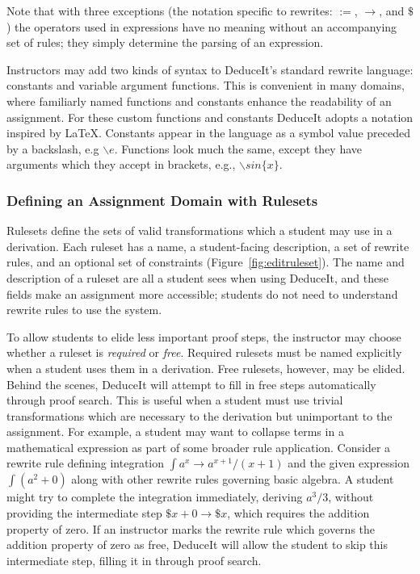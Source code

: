 \documentclass{sigchi}
\newcommand{\msb}[1]{\textbf{\textcolor{cyan}{Michael: #1}}}
\begin{document}
Note that with three exceptions (the notation specific to rewrites: $:=$, $\rightarrow$, and $\$$) the operators used in expressions have no meaning without an accompanying set of rules; they simply determine the parsing of an expression.

Instructors may add two kinds of syntax to DeduceIt's standard rewrite language: constants and variable argument functions. This is convenient in many domains, where familiarly named functions and constants enhance the readability of an assignment. For these custom functions and constants DeduceIt adopts a notation inspired by LaTeX. Constants appear in the language as a symbol value preceded by a backslash, e.g $\backslash{}e$. Functions look much the same, except they have arguments which they accept in brackets, e.g., $\backslash{}sin\{x\}$.

\subsubsection{Defining an Assignment Domain with Rulesets}

Rulesets define the sets of valid transformations which a student may use in a derivation. Each ruleset has a name, a student-facing description, a set of rewrite rules, and an optional set of constraints (Figure~\ref{fig:editruleset}). The name and description of a ruleset are all a student sees when using DeduceIt, and these fields  make an assignment more accessible; students do not need to understand rewrite rules to use the system.

To allow students to elide less important proof steps, the instructor may choose whether a ruleset is \emph{required} or \emph{free}. Required rulesets must be named explicitly when a student uses them in a derivation. Free rulesets, however, may be elided. Behind the scenes, DeduceIt will attempt to fill in free steps automatically through proof search. This is useful when a student must use trivial transformations which are necessary to the derivation but unimportant to the assignment. For example, a student may want to collapse terms in a mathematical expression as part of some broader rule application. Consider a rewrite rule defining integration $\int{a^x} \rightarrow a^{x+1}/(x+1)$ and the given expression $\int{(a^2+0)}$ along with other rewrite rules governing basic algebra. A student might try to complete the integration immediately, deriving $a^3/3$, without providing the intermediate step $\$x+0 \rightarrow \$x$, which requires the addition property of zero. If an instructor marks the rewrite rule which governs the addition property of zero as free, DeduceIt will allow the student to skip this intermediate step, filling it in through proof search. %
\end{document}
